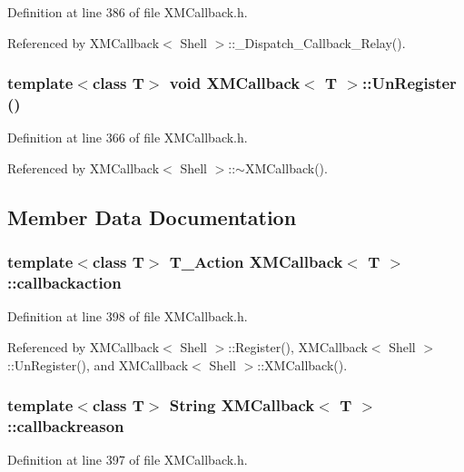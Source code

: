 Definition at line 386 of file XMCallback.h.

Referenced by XMCallback$<$ Shell $>$::\_\-Dispatch\_\-Callback\_\-Relay().
\subsubsection{\setlength{\rightskip}{0pt plus 5cm}template$<$class T$>$ void XMCallback$<$ T $>$::Un\-Register ()\hspace{0.3cm}{\tt  [inline]}}\label{classXMCallback_a4}




Definition at line 366 of file XMCallback.h.

Referenced by XMCallback$<$ Shell $>$::$\sim$XMCallback().

\subsection{Member Data Documentation}
\subsubsection{\setlength{\rightskip}{0pt plus 5cm}template$<$class T$>$ {\bf T\_\-Action} XMCallback$<$ T $>$::callbackaction\hspace{0.3cm}{\tt  [private]}}\label{classXMCallback_o2}




Definition at line 398 of file XMCallback.h.

Referenced by XMCallback$<$ Shell $>$::Register(), XMCallback$<$ Shell $>$::Un\-Register(), and XMCallback$<$ Shell $>$::XMCallback().
\subsubsection{\setlength{\rightskip}{0pt plus 5cm}template$<$class T$>$ String XMCallback$<$ T $>$::callbackreason\hspace{0.3cm}{\tt  [private]}}\label{classXMCallback_o1}




Definition at line 397 of file XMCallback.h.

